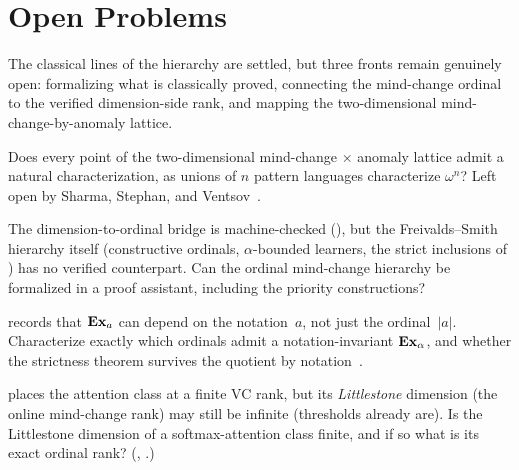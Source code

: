 
\section{Open Problems}
\label{sec:ordinals-open}

The classical lines of the hierarchy are settled, but three fronts remain
genuinely open: formalizing what is classically proved, connecting the
mind-change ordinal to the verified dimension-side rank, and mapping the
two-dimensional mind-change-by-anomaly lattice.

\begin{openprob}
\label{op:two-dim-lattice}
Does every point of the two-dimensional mind-change$\,\times\,$anomaly
lattice admit a natural characterization, as unions of $n$ pattern
languages characterize $\omega^n$?  Left open by Sharma, Stephan, and
Ventsov~\cite{SharmaStephanVentsov2004}.
\end{openprob}

\begin{openprob}
\label{op:formalize-ordinal-hierarchy}
The dimension-to-ordinal bridge is machine-checked
(), but the Freivalds--Smith hierarchy
itself (constructive ordinals, $\alpha$-bounded learners, the strict
inclusions of ) has no verified counterpart.
Can the ordinal mind-change hierarchy be formalized in a proof assistant,
including the priority constructions?
\end{openprob}

\begin{openprob}
\label{op:notation-invariance}
 records that $\mathbf{Ex}_a$ can depend on the
notation~$a$, not just the ordinal~$|a|$.  Characterize exactly which
ordinals admit a notation-invariant $\mathbf{Ex}_\alpha$, and whether the
strictness theorem survives the quotient by notation~\cite{MartinSharmaStephan2006}.
\end{openprob}

\begin{openprob}
\label{op:attention-ordinal-rank}
 places the attention class at a finite VC
rank, but its \emph{Littlestone} dimension (the online mind-change
rank) may still be infinite (thresholds already are).  Is the Littlestone
dimension of a softmax-attention class finite, and if so what is its exact
ordinal rank?  (,
.)
\end{openprob}

